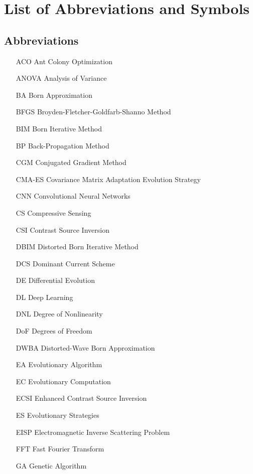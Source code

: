 \newpage
\chapter*{List of Abbreviations and Symbols}

	\section*{Abbreviations}
	
		\begin{itemize}[labelwidth=5em,leftmargin=\dimexpr{}+\relax,align=left]
			\item[ACO] Ant Colony Optimization
			\item[ANOVA] Analysis of Variance
			\item[BA] Born Approximation
			\item[BFGS] Broyden-Fletcher-Goldfarb-Shanno Method
			\item[BIM] Born Iterative Method
			\item[BP] Back-Propagation Method
			\item[CGM] Conjugated Gradient Method
			\item[CMA-ES] Covariance Matrix Adaptation Evolution Strategy
			\item[CNN] Convolutional Neural Networks
			\item[CS] Compressive Sensing
			\item[CSI] Contrast Source Inversion
			\item[DBIM] Distorted Born Iterative Method
			\item[DCS] Dominant Current Scheme
			\item[DE] Differential Evolution
			\item[DL] Deep Learning
			\item[DNL] Degree of Nonlinearity
			\item[DoF] Degrees of Freedom
			\item[DWBA] Distorted-Wave Born Approximation
			\item[EA] Evolutionary Algorithm
			\item[EC] Evolutionary Computation
			\item[ECSI] Enhanced Contrast Source Inversion
			\item[ES] Evolutionary Strategies
			\item[EISP] Electromagnetic Inverse Scattering Problem
			\item[FFT] Fast Fourier Transform
			\item[GA] Genetic Algorithm

\end{itemize}
